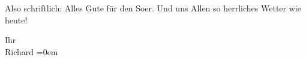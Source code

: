 \pstart
           Also schriftlich: Alles Gute für den So{\geminationm}er. Und uns
               Allen so herrliches Wetter wie heute!\pend
           
\pstart
           Ihr{\\[\baselineskip]}\spacefill\mbox{Richard}\pend
           \leftskip=0em{}\endnumbering{}  \newcommand{\dateiname}{L02184}\newcommand{\titel}{Richard Beer-Hofmann an Arthur Schnitzler, 27. 6. 1914}\newcommand{\editorInnen}{Martin Anton Müller und Gerd-Hermann Susen}
